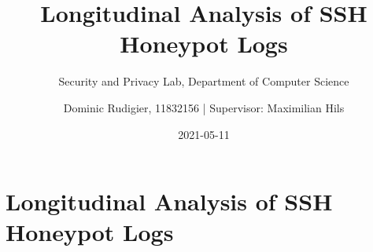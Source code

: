\documentclass[11pt,t,usepdftitle=false,aspectratio=169]{beamer}
\title[Analysis]{Longitudinal Analysis of SSH Honeypot Logs}
\subtitle{Security and Privacy Lab, Department of Computer Science}
\author[Dominic Rudigier]{Dominic Rudigier, 11832156  |  Supervisor: Maximilian Hils}
\date{2021-05-11}
\begin{document}



\section{Longitudinal Analysis of SSH Honeypot Logs}

\end{document}
